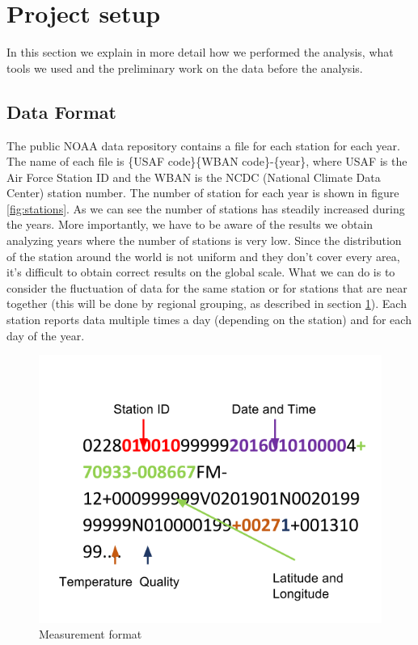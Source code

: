 \documentclass{vldb}
\begin{document}
\section{Project setup}
\label{sec:pro}
In this section we explain in more detail how we performed the analysis, what tools we used and the preliminary work on the data before the analysis.

\subsection{Data Format}
The public NOAA data repository contains a file for each station for each year. The name of each file is \{USAF code\}\-\{WBAN code\}-\{year\}, where USAF is the Air Force Station ID and the WBAN is the NCDC (National Climate Data Center) station number. The number of station for each year is shown in figure \ref{fig:stations}. As we can see the number of stations has steadily increased during the years. More importantly, we have to be aware of the results we obtain analyzing years where the number of stations is very low. Since the distribution of the station around the world is not uniform and they don't cover every area, it's difficult to obtain correct results on the global scale. What we can do is to consider the fluctuation of data for the same station or for stations that are near together (this will be done by regional grouping, as described in section \ref{sec:pro}). Each station reports data multiple times a day (depending on the station) and for each day of the year. \\

\begin{figure}[tbh]
\includegraphics[width=1\linewidth]{data}
\caption{Measurement format}
\label{fig:data}
\end{figure}
\end{document}
